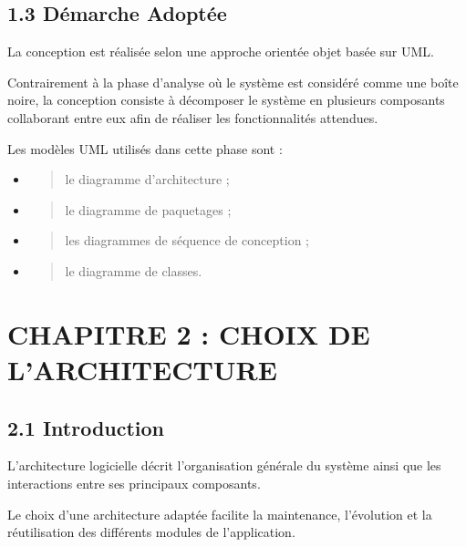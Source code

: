 \documentclass[
]{article}
\begin{document}
\hypertarget{duxe9marche-adoptuxe9e}{%
\subsection{1.3 Démarche Adoptée}\label{duxe9marche-adoptuxe9e}}

La conception est réalisée selon une approche orientée objet basée sur
UML.

Contrairement à la phase d'analyse où le système est considéré comme une
boîte noire, la conception consiste à décomposer le système en plusieurs
composants collaborant entre eux afin de réaliser les fonctionnalités
attendues.

Les modèles UML utilisés dans cette phase sont :

\begin{itemize}
\item
  \begin{quote}
  le diagramme d'architecture ;
  \end{quote}
\item
  \begin{quote}
  le diagramme de paquetages ;
  \end{quote}
\item
  \begin{quote}
  les diagrammes de séquence de conception ;
  \end{quote}
\item
  \begin{quote}
  le diagramme de classes.
  \end{quote}
\end{itemize}

\hypertarget{chapitre-2-choix-de-larchitecture}{%
\section{CHAPITRE 2 : CHOIX DE
L'ARCHITECTURE}\label{chapitre-2-choix-de-larchitecture}}

\hypertarget{introduction}{%
\subsection{2.1 Introduction}\label{introduction}}

L'architecture logicielle décrit l'organisation générale du système
ainsi que les interactions entre ses principaux composants.

Le choix d'une architecture adaptée facilite la maintenance, l'évolution
et la réutilisation des différents modules de l'application.
\end{document}
